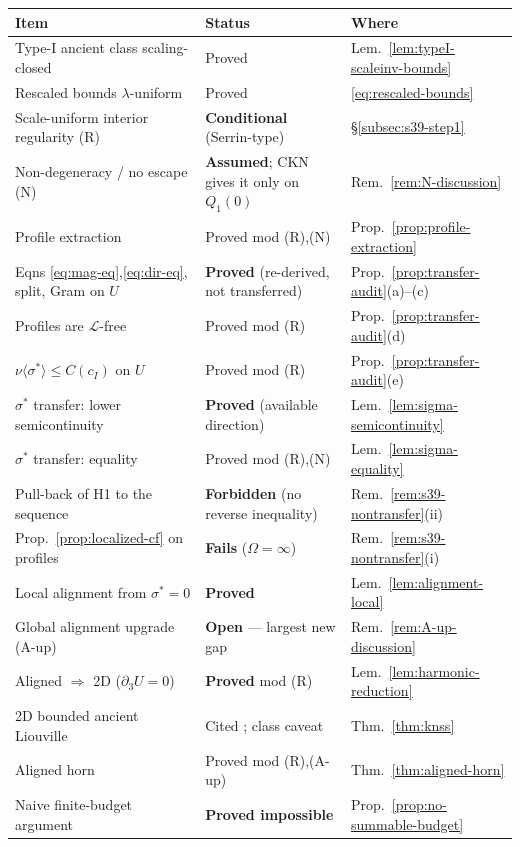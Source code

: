 \documentclass[11pt]{article}
\theoremstyle{definition}
\theoremstyle{remark}
\begin{document}
\begin{center}
\begin{tabular}{lll}
\hline
Item & Status & Where \\
\hline
Type-I ancient class scaling-closed & Proved & Lem.~\ref{lem:typeI-scaleinv-bounds} \\
Rescaled bounds $\lambda$-uniform & Proved & \eqref{eq:rescaled-bounds} \\
Scale-uniform interior regularity (R) & \textbf{Conditional} (Serrin-type) & \S\ref{subsec:s39-step1} \\
Non-degeneracy / no escape (N) & \textbf{Assumed}; CKN gives it only on $Q_1(0)$ & Rem.~\ref{rem:N-discussion} \\
Profile extraction & Proved mod (R),(N) & Prop.~\ref{prop:profile-extraction} \\
Eqns \eqref{eq:mag-eq},\eqref{eq:dir-eq}, split, Gram on $U$ & \textbf{Proved} (re-derived, not transferred) & Prop.~\ref{prop:transfer-audit}(a)--(c) \\
Profiles are $\mathcal{L}$-free & Proved mod (R) & Prop.~\ref{prop:transfer-audit}(d) \\
$\nu\langle\sigma^*\rangle\leq C(c_I)$ on $U$ & Proved mod (R) & Prop.~\ref{prop:transfer-audit}(e) \\
$\sigma^*$ transfer: lower semicontinuity & \textbf{Proved} (available direction) & Lem.~\ref{lem:sigma-semicontinuity} \\
$\sigma^*$ transfer: equality & Proved mod (R),(N) & Lem.~\ref{lem:sigma-equality} \\
Pull-back of H1 to the sequence & \textbf{Forbidden} (no reverse inequality) & Rem.~\ref{rem:s39-nontransfer}(ii) \\
Prop.~\ref{prop:localized-cf} on profiles & \textbf{Fails} ($\Omega=\infty$) & Rem.~\ref{rem:s39-nontransfer}(i) \\
Local alignment from $\sigma^*=0$ & \textbf{Proved} & Lem.~\ref{lem:alignment-local} \\
Global alignment upgrade (A-up) & \textbf{Open} --- largest new gap & Rem.~\ref{rem:A-up-discussion} \\
Aligned $\Rightarrow$ 2D ($\partial_3U=0$) & \textbf{Proved} mod (R) & Lem.~\ref{lem:harmonic-reduction} \\
2D bounded ancient Liouville & Cited \cite{KNSS2009}; class caveat & Thm.~\ref{thm:knss} \\
Aligned horn & Proved mod (R),(A-up) & Thm.~\ref{thm:aligned-horn} \\
Naive finite-budget argument & \textbf{Proved impossible} & Prop.~\ref{prop:no-summable-budget} \\

\end{tabular}
\end{center}
\end{document}
